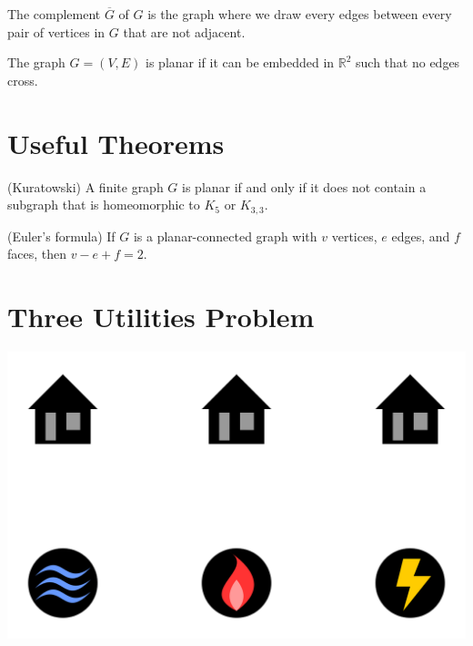 \documentclass{article}
\begin{document}
\begin{definition}
The complement $\overline{G}$ of $G$ is the graph where we draw every edges between every pair of vertices in $G$ that are not adjacent.
\end{definition}

\begin{definition}
The graph $G = (V, E)$ is planar if it can be embedded in $\mathbb{R}^{2}$ such that no edges cross. 
\end{definition}

\section{Useful Theorems}

\begin{theorem}(Kuratowski)
A finite graph $G$ is planar if and only if it does not contain a subgraph that is homeomorphic to $K_5$ or $K_{3,3}$.
\end{theorem}

\begin{theorem}(Euler's formula)
If $G$ is a planar-connected graph with $v$ vertices, $e$ edges, and $f$ faces, then $v - e + f = 2$. 
\end{theorem}

\section{Three Utilities Problem}
\begin{center} 
    \includegraphics[scale=0.3]{Pics/utilities.png}

\end{center}
\end{document}

